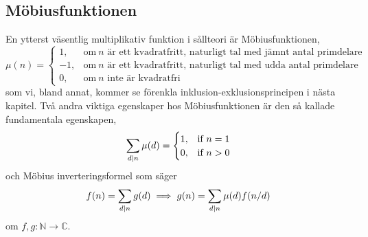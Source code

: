 \subsection{Möbiusfunktionen} \label{Mobius}
En ytterst väsentlig multiplikativ funktion i sållteori är Möbiusfunktionen,
\begin{equation*}
    \mu(n) = 
    \begin{cases}
        1, & \text{om}\ n \text{ är ett kvadratfritt, naturligt tal med jämnt antal primdelare}\\
        -1, & \text{om}\ n \text{ är ett kvadratfritt, naturligt tal med udda antal primdelare}\\
        0, & \text{om}\ n \text{ inte är kvadratfri}
    \end{cases}
\end{equation*}
som vi, bland annat, kommer se förenkla inklusion-exklusionsprincipen i nästa kapitel. Två andra viktiga egenskaper hos Möbiusfunktionen är den så kallade fundamentala egenskapen,
\begin{equation*}
    \sum_{d \mid n} \mu(d) =
    \begin{cases}
        1, & \text{if}\ n = 1 \\
        0, & \text{if}\ n > 0
    \end{cases}
\end{equation*}
och Möbius inverteringsformel som säger
\begin{equation} \label{mobiusinv}
    f(n) = \sum_{d \mid n} g(d) \implies g(n) = \sum_{d \mid n} \mu(d) f(n/d)
\end{equation}
om \(f, g : \mathbb{N} \to \mathbb{C}\).



